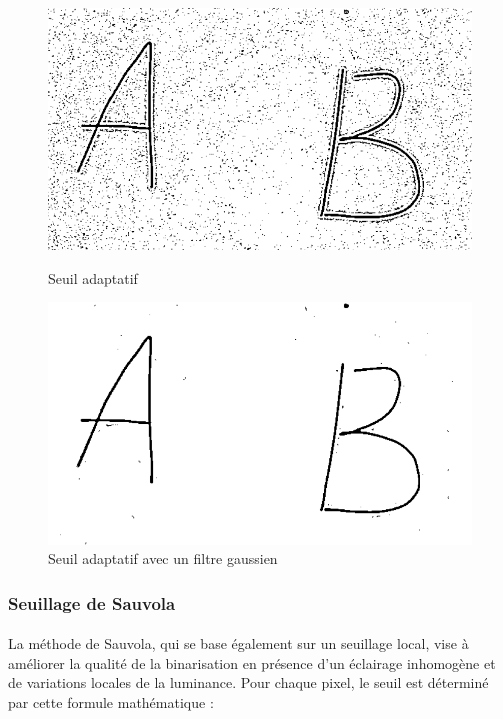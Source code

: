 \documentclass[a4paper]{article}
\begin{document}
				\vspace*{1cm}

				\begin{figure}[h!]
					\centering
					\begin{minipage}{.5\textwidth}
					  \centering
					  \includegraphics[width=.8\linewidth]{seuilAdaptatif.png}
					  \caption{Seuil adaptatif}
					  \label{fig:seuillageAdaptatif}
					\end{minipage}%
					\begin{minipage}{.5\textwidth}
					  \centering
					  \includegraphics[width=.8\linewidth]{seuilAdaptatifGauss.png}
					  \caption{Seuil adaptatif avec un filtre gaussien}
					  \label{fig:seuillageAdaptatifEtGauss}
					\end{minipage}
				\end{figure}


				

				\subsubsection{Seuillage de Sauvola}
				\paragraph{} La méthode de Sauvola, qui se base également sur un seuillage local, vise à améliorer la qualité de la binarisation en présence d'un éclairage inhomogène et de variations locales de la luminance. Pour chaque pixel, le seuil est déterminé par cette formule mathématique :
\end{document}
